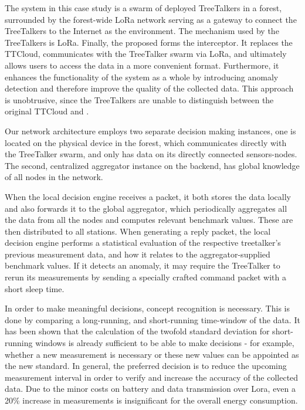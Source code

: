The system in this case study is a swarm of deployed TreeTalkers in a forest,
surrounded by the forest-wide LoRa network serving as a gateway to connect the TreeTalkers to the Internet as the environment.
The mechanism used by the TreeTalkers is LoRa.
Finally, the proposed \ttt forms the interceptor.
It replaces the TTCloud, communicates with the TreeTalker swarm via LoRa, and ultimately allows users to access the data in a more convenient format.
Furthermore, it enhances the functionality of the system as a whole by introducing anomaly detection and therefore improve the quality of the collected data.
This approach is unobtrusive, since the TreeTalkers are unable to distinguish between the original TTCloud and \ttt.

Our network architecture employs two separate decision making instances, one is located on the physical device in the forest, which communicates directly with the TreeTalker swarm, and only has data on its directly connected sensors-nodes.
The second, centralized aggregator instance on the backend, has global knowledge of all nodes in the network.

When the local decision engine receives a packet, it both stores the data locally and also forwards it to the global aggregator, which periodically aggregates all the data from all the nodes and computes relevant benchmark values. 
These are then distributed to all stations.
When generating a reply packet, the local decision engine performs a statistical evaluation of the respective treetalker's previous measurement data, and how it relates to the aggregator-supplied benchmark values.
If it detects an anomaly, it may require the TreeTalker to rerun its measurements by sending a specially crafted command packet with a short sleep time.

In order to make meaningful decisions, concept recognition is necessary.
This is done by comparing a long-running, and short-running time-window of the data.
It has been shown that the calculation of the twofold standard deviation for short-running windows is already sufficient to be able to make decisions - for example, whether a new measurement is necessary or these new values can be appointed as the new standard.
In general, the preferred decision is to reduce the upcoming measurement interval in order to verify and increase the accuracy of the collected data.
Due to the minor costs on battery and data transmission over Lora, even a 20\% increase in measurements is insignificant for the overall energy consumption. 

